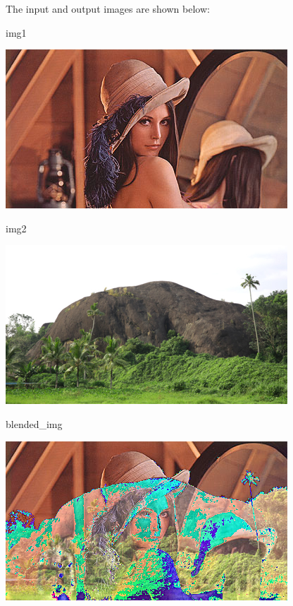 \documentclass[
  letterpaper,
  DIV=11,
  numbers=noendperiod]{scrreprt}
\newenvironment{Shaded}{\begin{snugshade}}{\end{snugshade}}
\newcommand{\NormalTok}[1]{\textcolor[rgb]{0.00,0.23,0.31}{#1}}
\theoremstyle{plain}
\theoremstyle{definition}
\theoremstyle{remark}
\begin{document}
The input and output images are shown below:

\begin{Shaded}
\begin{Highlighting}[]
\NormalTok{img1}
\end{Highlighting}
\end{Shaded}

\includegraphics{module_1_files/figure-pdf/cell-9-output-1.png}

\begin{Shaded}
\begin{Highlighting}[]
\NormalTok{img2}
\end{Highlighting}
\end{Shaded}

\includegraphics{module_1_files/figure-pdf/cell-10-output-1.png}

\begin{Shaded}
\begin{Highlighting}[]
\NormalTok{blended\_img}
\end{Highlighting}
\end{Shaded}

\includegraphics{module_1_files/figure-pdf/cell-11-output-1.png}
\end{document}

